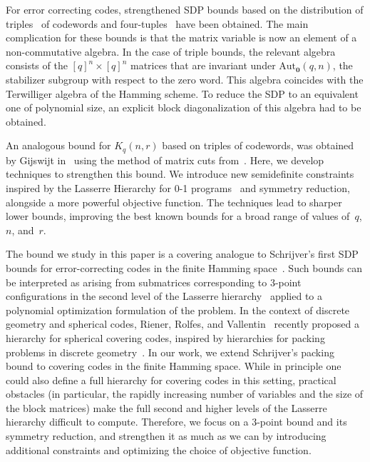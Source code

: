 \documentclass[10pt,a4paper]{article}
\theoremstyle{definition}
\newcommand{\zero}{\mathbf{0}}
\newcommand{\AutZ}{\mathrm{Aut}_{\zero}}
\begin{document}
For error correcting codes, strengthened SDP bounds based on the distribution of triples~\cite{Sch05,GST06} of codewords and four-tuples~\cite{GMS12,LPS2017} have been obtained. The main complication for these bounds is that the matrix variable is now an element of a non-commutative algebra. In the case of triple bounds, the relevant algebra consists of the $[q]^n\times [q]^n$ matrices that are invariant under $\AutZ(q,n)$, the stabilizer subgroup with respect to the zero word. This algebra coincides with the Terwilliger algebra of the Hamming scheme. To reduce the SDP to an equivalent one of polynomial size, an explicit block diagonalization of this algebra had to be obtained. 

An analogous bound for $K_q(n,r)$ based on triples of codewords, was obtained by Gijswijt in~\cite[Section 5.3.2]{DionThesis} using the method of matrix cuts from~\cite{LS}. Here, we develop techniques to strengthen this bound. We introduce new semidefinite constraints inspired by the Lasserre Hierarchy for 0-1 programs~\cite{Lasserre, Lasserre2001b} and symmetry reduction, alongside a more powerful objective function. The techniques lead to sharper lower bounds, improving the best known bounds for a broad range of values of~$q$, $n$, and~$r$.



The bound we study in this paper is a covering analogue to Schrijver's first SDP bounds for error-correcting codes in the finite Hamming space~\cite{Sch05}. Such bounds can be interpreted as arising from submatrices corresponding to 3-point configurations in the second level of the Lasserre hierarchy~\cite{Lasserre} applied to a polynomial optimization formulation of the problem. In the context of discrete geometry and spherical codes, Riener, Rolfes, and Vallentin~\cite{RRV26} recently proposed a hierarchy for spherical covering codes, inspired by hierarchies for packing problems in discrete geometry~\cite{LV15}. In our work, we extend Schrijver's packing bound to covering codes in the finite Hamming space. While in principle one could also define a full hierarchy for covering codes in this setting, practical obstacles (in particular, the rapidly increasing number of variables and the size of the block matrices) make the full second and higher levels of the Lasserre hierarchy difficult to compute. Therefore, we focus on a 3-point bound and its symmetry reduction, and strengthen it as much as we can by introducing additional constraints and optimizing the choice of objective function.
\end{document}
